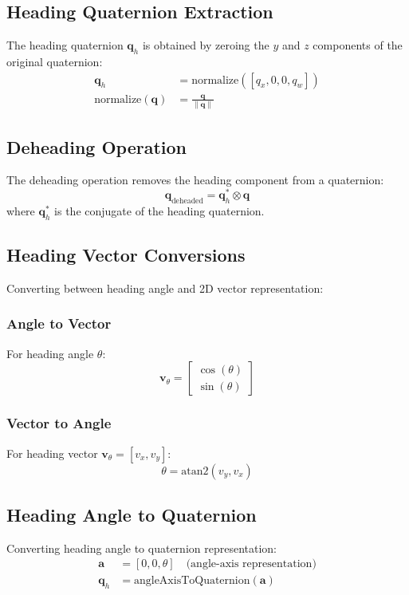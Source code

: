 \subsection*{Heading Quaternion Extraction}
The heading quaternion $\mathbf{q}_h$ is obtained by zeroing the $y$ and $z$ components of the original quaternion:
\begin{align}
    \mathbf{q}_h &= \text{normalize}([q_x, 0, 0, q_w]) \\
    \text{normalize}(\mathbf{q}) &= \frac{\mathbf{q}}{\|\mathbf{q}\|}
\end{align}

\subsection*{Deheading Operation}
The deheading operation removes the heading component from a quaternion:
\begin{equation}
    \mathbf{q}_{\text{deheaded}} = \mathbf{q}_h^* \otimes \mathbf{q}
\end{equation}
where $\mathbf{q}_h^*$ is the conjugate of the heading quaternion.

\subsection*{Heading Vector Conversions}
Converting between heading angle and 2D vector representation:

\subsubsection*{Angle to Vector}
For heading angle $\theta$:
\begin{equation}
    \mathbf{v}_\theta = \begin{bmatrix}
        \cos(\theta) \\
        \sin(\theta)
    \end{bmatrix}
\end{equation}

\subsubsection*{Vector to Angle}
For heading vector $\mathbf{v}_\theta = [v_x, v_y]$:
\begin{equation}
    \theta = \text{atan2}(v_y, v_x)
\end{equation}

\subsection*{Heading Angle to Quaternion}
Converting heading angle to quaternion representation:
\begin{align}
    \mathbf{a} &= [0, 0, \theta] \quad \text{(angle-axis representation)} \\
    \mathbf{q}_h &= \text{angleAxisToQuaternion}(\mathbf{a})
\end{align}

